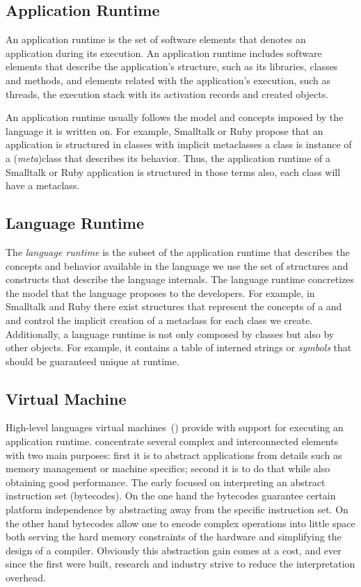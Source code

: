 \subsection{Application Runtime}

An application runtime is the set of software elements that denotes an application during its execution. An application runtime includes software elements that describe the application's structure, such as its libraries, classes and methods, and elements related with the application's execution, such as threads, the execution stack with its activation records and created objects.

An application runtime usually follows the model and concepts imposed by the language it is written on. For example, Smalltalk or Ruby propose that an application is structured in classes with implicit metaclasses \ie a class is instance of a (\emph{meta})class that describes its behavior. Thus, the application runtime of a Smalltalk or Ruby application is structured in those terms also, each class will have a metaclass.

\subsection{Language Runtime}

The \emph{language runtime} is the subset of the application runtime that describes the concepts and behavior available in the language we use \ie the set of structures and constructs that describe the language internals. The language runtime concretizes the model that the language proposes to the developers. For example, in Smalltalk and Ruby there exist structures that represent the concepts of a  and  and control the implicit creation of a metaclass for each class we create. Additionally, a language runtime is not only composed by classes but also by other objects. For example, it contains a table of interned strings or \emph{symbols} that should be guaranteed unique at runtime.

\subsection{Virtual Machine}

High-level languages virtual machines~(\VMs) provide with support for executing an application runtime.
\VMs concentrate several complex and interconnected elements with two main purposes: first it is to abstract applications from details such as memory management or machine specifics; second it is to do that while also obtaining good performance.
The early \VMs focused on interpreting an abstract instruction set (bytecodes).
On the one hand the bytecodes guarantee certain platform independence by abstracting away from the \CPU specific instruction set.
On the other hand bytecodes allow one to encode complex operations into little space both serving the hard memory constraints of the hardware and simplifying the design of a compiler.
Obviously this abstraction gain comes at a cost, and ever since the first \VMs were built, research and industry strive to reduce the interpretation overhead.

